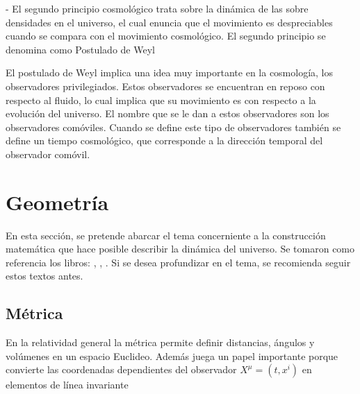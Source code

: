 - El segundo principio cosmológico trata sobre la dinámica de las sobre densidades en el universo, el cual enuncia que el  movimiento es despreciables cuando se compara con el movimiento cosmológico. El segundo principio se denomina como Postulado de Weyl \cite{janssen2013} %


El postulado de Weyl implica una idea muy importante en la cosmología, los observadores privilegiados. Estos observadores  se encuentran en reposo con respecto al fluido, lo cual implica que su movimiento es con respecto a la evolución del universo. El nombre que se le dan a estos observadores son los observadores comóviles. Cuando se define este tipo de observadores también se define un tiempo cosmológico, que corresponde a la dirección temporal del observador comóvil. 



\section{Geometría}
\label{sec:Geometría}
En esta sección, se pretende abarcar el tema concerniente a la construcción matemática que hace posible describir la dinámica del universo. Se tomaron como referencia los libros: \cite{janssen2013}, \cite{longair2008}, \cite{baumann}. Si se desea profundizar en el tema, se recomienda seguir estos textos antes.
	\subsection{Métrica}
	\label{subsec:Metrica}
	
En la relatividad general la métrica permite definir distancias, ángulos y volúmenes en un espacio Euclideo. Además juega un papel importante porque convierte las coordenadas dependientes del observador $X^{\mu}=(t,x^{i})$ en elementos de línea invariante



